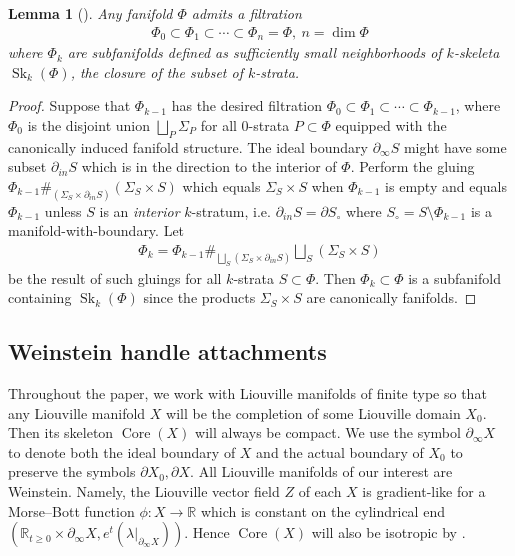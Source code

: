 \documentclass[a4paper,12pt, twoside, pdftex]{amsart}
\newtheorem{lemma}[dummy]{Lemma}
\theoremstyle{definition}
\numberwithin{equation}{section}
\newcommand{\Core}{\operatorname{Core}}
\newcommand{\del}{\partial}
\newcommand{\Sk}{\operatorname{Sk}}
\newcommand{\bR}{\mathbb{R}}
\begin{document}
\begin{lemma}[{\cite[Remark 2.12]{GS1}}] \label{lem:filtration}
Any fanifold
$\Phi$
admits a filtration
\begin{align} \label{eq:filtration1}
\Phi_0
\subset
\Phi_1
\subset
\cdots
\subset
\Phi_n = \Phi, \
n = \dim \Phi
\end{align}
where
$\Phi_k$
are subfanifolds defined as sufficiently small neighborhoods of $k$-skeleta
$\Sk_k(\Phi)$,
the closure of the subset of $k$-strata.
\end{lemma}
\begin{proof}
Suppose that
$\Phi_{k-1}$
has the desired filtration
$\Phi_0 \subset \Phi_1 \subset \cdots \subset \Phi_{k-1}$,
where
$\Phi_0$
is the disjoint union
$\bigsqcup_P \Sigma_P$
for all $0$-strata
$P \subset \Phi$
equipped with the canonically induced fanifold structure.
The ideal boundary
$\del_\infty S$
might have some subset
$\del_{in} S$
which is in the direction to the interior of
$\Phi$.
Perform the gluing
$\Phi_{k-1} \#_{(\Sigma_S \times \del_{in} S)} (\Sigma_S \times S)$
which
equals
$\Sigma_S \times S$
when
$\Phi_{k-1}$
is empty
and
equals
$\Phi_{k-1}$
unless
$S$
is an
\emph{interior}
$k$-stratum,
i.e.
$\del_{in} S = \del S_\circ$
where
$S_\circ = S \setminus \Phi_{k-1}$
is a manifold-with-boundary.
Let
\begin{align*}
\Phi_k = \Phi_{k-1} \#_{\bigsqcup_S (\Sigma_S \times \del_{in} S)} \bigsqcup_S (\Sigma_S \times S)
\end{align*}
be the result of such gluings for all $k$-strata
$S \subset \Phi$.
Then
$\Phi_k \subset \Phi$
is a subfanifold containing
$\Sk_k(\Phi)$
since the products
$\Sigma_S \times S$
are canonically fanifolds.
\end{proof}

\subsection{Weinstein handle attachments}
Throughout the paper,
we work with Liouville manifolds of finite type
so that
any Liouville manifold
$X$
will be the completion of some Liouville domain
$X_0$.
Then its skeleton
$\Core(X)$
will always be compact.
We use the symbol
$\del_\infty X$
to denote both
the ideal boundary of
$X$
and
the actual boundary of
$X_0$
to preserve the symbols
$\del X_0, \del X$.
All Liouville manifolds of our interest are Weinstein.
Namely,
the Liouville vector field
$Z$
of each
$X$
is gradient-like for a Morse--Bott function
$\phi \colon X \to \bR$
which is constant on the cylindrical end
$(\bR_{t \geq 0} \times \del_\infty X, e^t (\lambda |_{\del_\infty X}))$.
Hence
$\Core(X)$
will also be isotropic by
\cite[Lemma 11.13(a)]{CE}.
\end{document}
